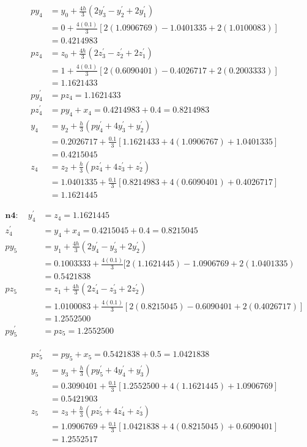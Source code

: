 \documentclass[10pt]{article}
\begin{document}
$$
\begin{aligned}
p y_{4} & =y_{0}+\frac{4 h}{3}\left(2 y_{3}^{\prime}-y_{2}^{\prime}+2 y_{1}^{\prime}\right) \\
& =0+\frac{4(0.1)}{3}[2(1.0906769)-1.0401335+2(1.0100083)] \\
& =0.4214983 \\
p z_{4} & =z_{0}+\frac{4 h}{3}\left(2 z_{3}^{\prime}-z_{2}^{\prime}+2 z_{1}^{\prime}\right) \\
& =1+\frac{4(0.1)}{3}[2(0.6090401)-0.4026717+2(0.2003333)] \\
& =1.1621433 \\
p y_{4}^{\prime} & =p z_{4}=1.1621433 \\
p z_{4}^{\prime} & =p y_{4}+x_{4}=0.4214983+0.4=0.8214983 \\
y_{4} & =y_{2}+\frac{h}{3}\left(p y_{4}^{\prime}+4 y_{3}^{\prime}+y_{2}^{\prime}\right) \\
& =0.2026717+\frac{0.1}{3}[1.1621433+4(1.0906767)+1.0401335] \\
& =0.4215045 \\
z_{4} & =z_{2}+\frac{h}{3}\left(p z_{4}^{\prime}+4 z_{3}^{\prime}+z_{2}^{\prime}\right) \\
& =1.0401335+\frac{0.1}{3}[0.8214983+4(0.6090401)+0.4026717] \\
& =1.1621445
\end{aligned}
$$

$$
\begin{aligned}
\boldsymbol{n} \mathbf{4}: \quad y_{4}^{\prime} & =z_{4}=1.1621445 \\
z_{4}^{\prime} & =y_{4}+x_{4}=0.4215045+0.4=0.8215045 \\
p y_{5} & =y_{1}+\frac{4 h}{3}\left(2 y_{4}^{\prime}-y_{3}^{\prime}+2 y_{2}^{\prime}\right) \\
& =0.1003333+\frac{4(0.1)}{3}[2(1.1621445)-1.0906769+2(1.0401335) \\
& =0.5421838 \\
p z_{5} & =z_{1}+\frac{4 h}{3}\left(2 z_{4}^{\prime}-z_{3}^{\prime}+2 z_{2}^{\prime}\right) \\
& =1.0100083+\frac{4(0.1)}{3}[2(0.8215045)-0.6090401+2(0.4026717)] \\
& =1.2552500 \\
p y_{5}^{\prime} & =p z_{5}=1.2552500
\end{aligned}
$$

$$
\begin{aligned}
p z_{5}^{\prime} & =p y_{5}+x_{5}=0.5421838+0.5=1.0421838 \\
y_{5} & =y_{3}+\frac{h}{3}\left(p y_{5}^{\prime}+4 y_{4}^{\prime}+y_{3}^{\prime}\right) \\
& =0.3090401+\frac{0.1}{3}[1.2552500+4(1.1621445)+1.0906769] \\
& =0.5421903 \\
z_{5} & =z_{3}+\frac{h}{3}\left(p z_{5}^{\prime}+4 z_{4}^{\prime}+z_{3}^{\prime}\right) \\
& =1.0906769+\frac{0.1}{3}[1.0421838+4(0.8215045)+0.6090401] \\
& =1.2552517
\end{aligned}
$$
\end{document}
